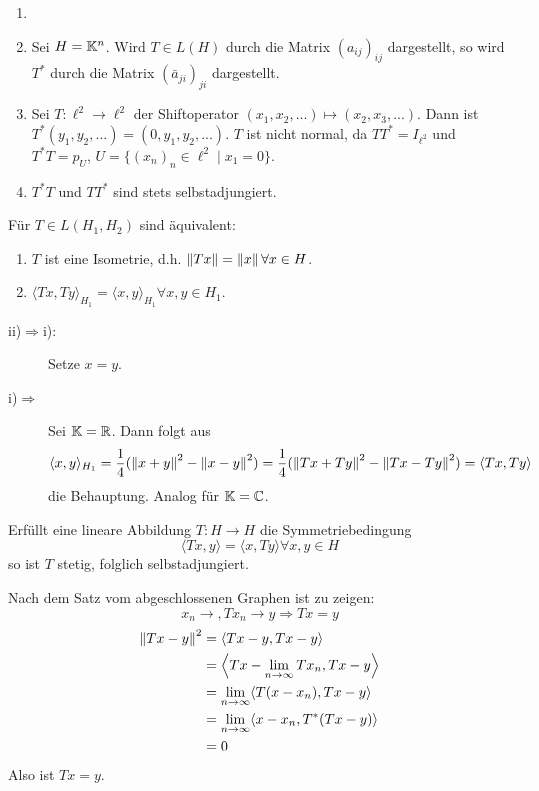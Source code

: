 \begin{beispiel*}
	\begin{enumerate}
		\item[]
		\item Sei $ H=\mathbb{K}^n $. Wird $ T\in L(H) $ durch die Matrix $ (a_{ij})_{ij} $ dargestellt, so wird $ T^\ast $  durch die Matrix $ (\bar a_{ji})_{ji} $ dargestellt.  
		\item Sei $ T\colon\ell^2\rightarrow\ell^2 $ der Shiftoperator $ (x_1,x_2,...)\mapsto(x_2,x_3,...) $. Dann ist $ T^\ast(y_1,y_2,...)=(0,y_1,y_2,...) $. $ T $ ist nicht normal, da $ TT^\ast=I_{\ell^2} $ und $ T^\ast T=p_U $, $ U=\lbrace (x_n)_n\in\ell^2\mid x_1=0\rbrace $.
		\item $ T^\ast T $ und $ TT^\ast $ sind stets selbstadjungiert.
 	\end{enumerate}
\end{beispiel*}
\begin{lemma}
	F\"ur $ T\in L(H_1,H_2) $ sind \"aquivalent:
	\begin{enumerate}
		\item $ T $ ist eine Isometrie, d.h. $ \left\|Tx\right\|=\left\|x\right\|\forall x\in H $.
		\item $ \langle Tx,Ty\rangle_{H_1}=\langle x,y\rangle_{H_1} \forall x,y\in H_1$.
	\end{enumerate}
\end{lemma}
\newpage
\begin{beweis}
	\begin{description}
		\item[ii)$ \Rightarrow $i):] Setze $ x=y $.
		\item[i)$ \Rightarrow $] Sei $ \mathbb{K}=\mathbb{R} $. Dann folgt aus
		\[ \langle x,y\rangle_{H_1}=\frac{1}{4}(\left\|x+y\right\|^2-\left\|x-y\right\|^2)=\frac{1}{4}(\left\|Tx+Ty\right\|^2-\left\|Tx-Ty\right\|^2)=\langle Tx,Ty\rangle \]
		die Behauptung. Analog f\"ur $ \mathbb{K}=\mathbb{C} $.
	\end{description}
\end{beweis}
\begin{satz}
	Erf\"ullt eine lineare Abbildung $ T\colon H\rightarrow H $ die Symmetriebedingung
	\[ \langle Tx,y\rangle=\langle x,Ty\rangle\forall x,y\in H \]
	so ist $ T $ stetig, folglich selbstadjungiert.
\end{satz}
\begin{beweis}
	Nach dem Satz vom abgeschlossenen Graphen ist zu zeigen: \[ x_n\rightarrow, Tx_n\rightarrow y\Rightarrow Tx=y\]
	\begin{align*} \left\|Tx-y\right\|^2&=\langle Tx-y,Tx-y\rangle\\&=\left\langle Tx-\lim_{n\to\infty} Tx_n,Tx-y\right\rangle\\&=\lim_{n\to\infty}\langle T(x-x_n),Tx-y\rangle\\&=\lim_{n\to\infty}\langle x-x_n,T^\ast(Tx-y)\rangle\\&=0 \end{align*}
	Also ist $ Tx=y $.
\end{beweis}
